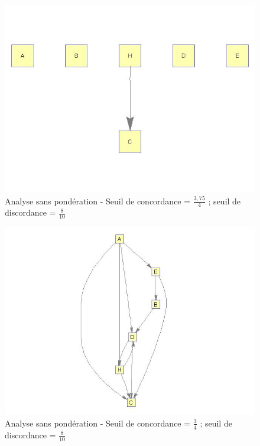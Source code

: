 \documentclass[a4paper,10pt]{article}
\begin{document}
\begin{figure}[H]
\begin{center}
\includegraphics[scale=0.3]{img/G1-neutre.jpg}
\caption{Analyse sans pondération - Seuil de concordance = $\frac{3,75}{4}$ ; seuil de discordance = $\frac{8}{10}$}
\end{center}
\end{figure}

\begin{figure}[H]
\begin{center}
\includegraphics[scale=0.3]{img/G2-neutre.jpg}
\caption{Analyse sans pondération - Seuil de concordance = $\frac{3}{4}$ ; seuil de discordance = $\frac{8}{10}$}
\end{center}
\end{figure}
\end{document}
